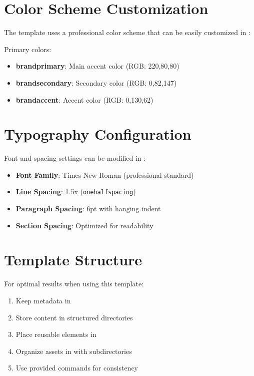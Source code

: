 \documentclass{internshipreport}
\begin{document}
\section{Color Scheme Customization}

The template uses a professional color scheme that can be easily customized in :

\begin{technicalbox}
Primary colors:
\begin{itemize}
\item \textcolor{brandprimary}{\textbf{brandprimary}}: Main accent color (RGB: 220,80,80)
\item \textcolor{brandsecondary}{\textbf{brandsecondary}}: Secondary color (RGB: 0,82,147)
\item \textcolor{brandaccent}{\textbf{brandaccent}}: Accent color (RGB: 0,130,62)
\end{itemize}
\end{technicalbox}

\section{Typography Configuration}

Font and spacing settings can be modified in :

\begin{itemize}
\item \textbf{Font Family}: Times New Roman (professional standard)
\item \textbf{Line Spacing}: 1.5x (\texttt{onehalfspacing})
\item \textbf{Paragraph Spacing}: 6pt with hanging indent
\item \textbf{Section Spacing}: Optimized for readability
\end{itemize}

\section{Template Structure}

\begin{bestpractice}
For optimal results when using this template:
\begin{enumerate}
\item Keep metadata in 
\item Store content in structured  directories
\item Place reusable elements in 
\item Organize assets in  with subdirectories
\item Use provided commands for consistency
\end{enumerate}
\end{bestpractice}
\end{document}
